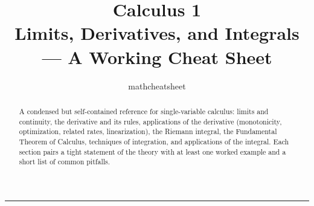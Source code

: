 \documentclass[11pt]{article}
\title{\textbf{Calculus 1}\\[2pt]\large Limits, Derivatives, and Integrals --- A Working Cheat Sheet}
\author{mathcheatsheet}
\date{}
\begin{document}
\maketitle
\thispagestyle{empty}

\begin{abstract}
\noindent A condensed but self-contained reference for single-variable calculus:
limits and continuity, the derivative and its rules, applications of the derivative
(monotonicity, optimization, related rates, linearization), the Riemann integral,
the Fundamental Theorem of Calculus, techniques of integration, and applications
of the integral. Each section pairs a tight statement of the theory with at least
one worked example and a short list of common pitfalls.
\end{abstract}

\tableofcontents
\bigskip\hrule\bigskip









\end{document}
